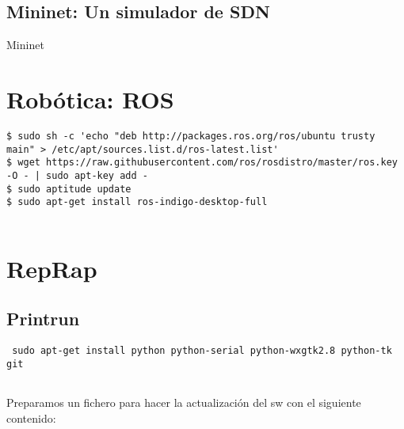 \subsection{Mininet: Un simulador de
SDN}\label{mininet-un-simulador-de-sdn}

Mininet

\section{Robótica: ROS}\label{robuxf3tica-ros}

\begin{verbatim}
$ sudo sh -c 'echo "deb http://packages.ros.org/ros/ubuntu trusty main" > /etc/apt/sources.list.d/ros-latest.list'
$ wget https://raw.githubusercontent.com/ros/rosdistro/master/ros.key -O - | sudo apt-key add -
$ sudo aptitude update
$ sudo apt-get install ros-indigo-desktop-full
    
\end{verbatim}

\section{RepRap}\label{reprap}

\subsection{Printrun}\label{printrun}

\begin{verbatim}
 sudo apt-get install python python-serial python-wxgtk2.8 python-tk git
      
\end{verbatim}

Preparamos un fichero para hacer la actualización del sw con el
siguiente contenido:


